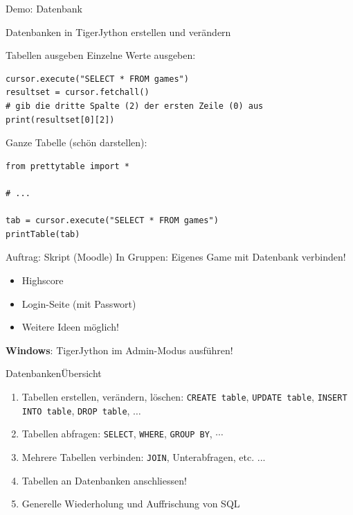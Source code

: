 \begin{frame}[fragile]{Demo: Datenbank}
\begin{center}
Datenbanken in TigerJython erstellen und verändern
\end{center}
\end{frame}

\begin{frame}[fragile]{Tabellen ausgeben}
Einzelne Werte ausgeben:
\begin{lstlisting}[style=Python]
cursor.execute("SELECT * FROM games")
resultset = cursor.fetchall()
# gib die dritte Spalte (2) der ersten Zeile (0) aus
print(resultset[0][2]) 
\end{lstlisting}

Ganze Tabelle (schön darstellen):
\begin{lstlisting}[style=Python]
from prettytable import *

# ... 

tab = cursor.execute("SELECT * FROM games")
printTable(tab)
\end{lstlisting}


\end{frame}

\begin{frame}[fragile]{Auftrag: Skript (Moodle)}
In Gruppen: Eigenes Game mit Datenbank verbinden!
\begin{itemize}
\item Highscore
\item Login-Seite (mit Passwort)
\item Weitere Ideen möglich!
\end{itemize}
\begin{myattention}
\faWindows{} \textbf{Windows}: TigerJython im Admin-Modus ausführen!
\end{myattention}
\end{frame}

\begin{frame}{Datenbanken}{Übersicht}
	\begin{enumerate}
		\item \faCheckSquare{} Tabellen erstellen, verändern, löschen: \lstinline|CREATE table|, \lstinline|UPDATE table|, \lstinline|INSERT INTO table|, \lstinline|DROP table|, $\ldots$
		\item \faCheckSquare{} Tabellen abfragen: \lstinline|SELECT|, \lstinline|WHERE|, \lstinline|GROUP BY|, $\cdots$
		\item \faCheckSquare{} Mehrere Tabellen verbinden: \lstinline|JOIN|, Unterabfragen, etc. ...
		\item \faCheckSquare{} Tabellen an Datenbanken anschliessen!
		\item \faSquare{} Generelle Wiederholung und Auffrischung von SQL 
	\end{enumerate}
\end{frame}

